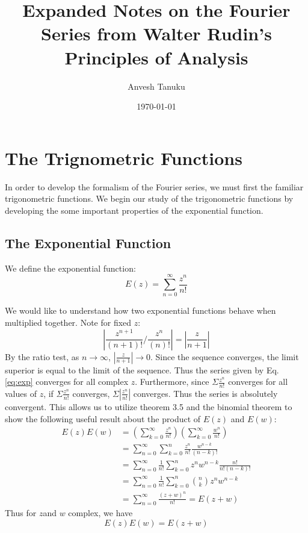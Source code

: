 \documentclass{article}
\title{Expanded Notes on the Fourier Series from Walter Rudin's Principles of Analysis }
\author{Anvesh Tanuku}
\date{\today}
\begin{document}
\maketitle
\section{The Trignometric Functions}
In order to develop the formalism of the Fourier series, we must first the familiar trigonometric functions.  We begin our study of the trigonometric functions by developing the some important properties of the exponential function.
\subsection{The Exponential Function}
We define the exponential function:  
\begin{equation}
\label{eq:exp}
E(z)=\sum_{n=0}^\infty \frac{z^n}{n!}
\end{equation}

We would like to understand how two exponential functions behave when multiplied together. 
Note for fixed $z$:
$$\left|\frac{z^{n+1}}{(n+1)!}/\frac{z^{n}}{(n)!}\right| = \left|\frac{z}{n+1}\right|$$  By the ratio test,  as $n\rightarrow\infty$, $\left|\frac{z}{n+1}\right|\rightarrow 0$.  Since the sequence converges, the limit superior is  equal to the limit of the sequence.  Thus the series given by Eq. \ref{eq:exp} converges for all complex $z$.  Furthermore, since $\Sigma \frac{z^n}{n!}$ converges for all values of $z$, if $\Sigma \frac{z^n}{n!}$  converges, $\Sigma |\frac{z^n}{n!}|$ converges.  Thus the series is absolutely convergent.   This allows us to utilize theorem 3.5 and the binomial theorem to show the following useful result about the product of $E(z)$ and $E(w)$:
\begin{align} 
E(z)E(w)  &=\left(\sum_{k=0}^\infty \frac{z^n}{n!} \right) \left(\sum_{k=0}^\infty\frac{w^n}{n!} \right) \\&=\sum_{n=0}^\infty \sum_{k=0}^n \frac{z^n}{n!}\frac{w^{n-k}}{(n-k)!}\\
&=\sum_{n=0}^\infty \frac{1}{n!}\sum_{k=0}^n z^nw^{n-k}\frac{n!}{n!(n-k)!}\\
&=\sum_{n=0}^\infty \frac{1}{n!}\sum_{k=0}^n {n\choose k }z^nw^{n-k}\\
& =\sum_{n=0}^\infty \frac{(z+w)^n}{n!}= E(z+w)
\end{align}
Thus for $z $and $w$ complex, we have 
\begin{equation}
\label{eq:add}
E(z)E(w)= E(z+w)
\end{equation}
\end{document}
